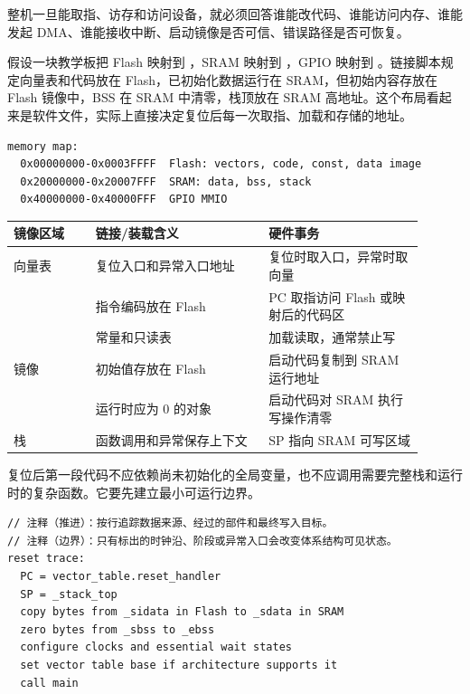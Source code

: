 整机一旦能取指、访存和访问设备，就必须回答谁能改代码、谁能访问内存、谁能发起 DMA、谁能接收中断、启动镜像是否可信、错误路径是否可恢复。

假设一块教学板把 Flash 映射到 ，SRAM 映射到 ，GPIO 映射到 。链接脚本规定向量表和代码放在 Flash，已初始化数据运行在 SRAM，但初始内容存放在 Flash 镜像中，BSS 在 SRAM 中清零，栈顶放在 SRAM 高地址。这个布局看起来是软件文件，实际上直接决定复位后每一次取指、加载和存储的地址。

\begin{lstlisting}
memory map:
  0x00000000-0x0003FFFF  Flash: vectors, code, const, data image
  0x20000000-0x20007FFF  SRAM: data, bss, stack
  0x40000000-0x40000FFF  GPIO MMIO
\end{lstlisting}

\begin{longtable}{L{0.18\linewidth}L{0.38\linewidth}L{0.34\linewidth}}
\toprule
镜像区域 & 链接/装载含义 & 硬件事务 \\
\midrule
向量表 & 复位入口和异常入口地址 & 复位时取入口，异常时取向量 \\\tablerowrule
{} & 指令编码放在 Flash & PC 取指访问 Flash 或映射后的代码区 \\\tablerowrule
{} & 常量和只读表 & 加载读取，通常禁止写 \\\tablerowrule
{} 镜像 & 初始值存放在 Flash & 启动代码复制到 SRAM 运行地址 \\\tablerowrule
{} & 运行时应为 0 的对象 & 启动代码对 SRAM 执行写操作清零 \\\tablerowrule
栈 & 函数调用和异常保存上下文 & SP 指向 SRAM 可写区域 \\
\bottomrule
\end{longtable}

复位后第一段代码不应依赖尚未初始化的全局变量，也不应调用需要完整栈和运行时的复杂函数。它要先建立最小可运行边界。

\begin{lstlisting}
// 注释（推进）：按行追踪数据来源、经过的部件和最终写入目标。
// 注释（边界）：只有标出的时钟沿、阶段或异常入口会改变体系结构可见状态。
reset trace:
  PC = vector_table.reset_handler
  SP = _stack_top
  copy bytes from _sidata in Flash to _sdata in SRAM
  zero bytes from _sbss to _ebss
  configure clocks and essential wait states
  set vector table base if architecture supports it
  call main
\end{lstlisting}

